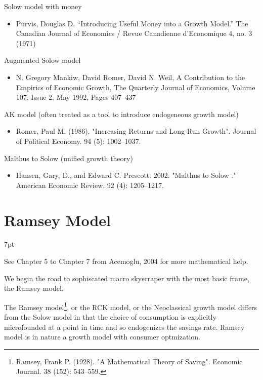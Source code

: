 \documentclass{article}
\newenvironment{greenblock}{%
\def\FrameCommand{%
  \hspace{1pt}%
    {\color{Green}%
    \vrule width 2pt}%
    {\color{greenshade}%
    \vrule width 4pt}%
  \colorbox{greenshade}%
}%
\MakeFramed{%
  \advance%
  \hsize-%
  \width%
  \FrameRestore}%
\noindent\hspace{-4.55pt}%
\begin{adjustwidth}{}{7pt}%
\vspace{2pt}\vspace{2pt}%
}
{%
\vspace{2pt}\end{adjustwidth}\endMakeFramed%
}
\begin{document}
Solow model with money
\begin{itemize}
  \item Purvis, Douglas D. “Introducing Useful Money into a Growth Model.” The Canadian Journal of Economics / Revue Canadienne d’Economique 4, no. 3 (1971)
\end{itemize}

Augmented Solow model

\begin{itemize}
  \item N. Gregory Mankiw, David Romer, David N. Weil, A Contribution to the Empirics of Economic Growth, The Quarterly Journal of Economics, Volume 107, Issue 2, May 1992, Pages 407–437
\end{itemize}

AK model (often treated as a tool to introduce endogeneous growth model)

\begin{itemize}
  \item Romer, Paul M. (1986). "Increasing Returns and Long-Run Growth". Journal of Political Economy. 94 (5): 1002–1037.
\end{itemize}

Malthus to Solow (unified growth theory)

\begin{itemize}
  \item Hansen, Gary, D., and Edward C. Prescott. 2002. "Malthus to Solow ." American Economic Review, 92 (4): 1205–1217.
\end{itemize}










\newpage
\section{Ramsey Model}

\begin{greenblock}
See Chapter 5 to Chapter 7 from Acemoglu, 2004 for more mathematical help.
\end{greenblock}

We begin the road to sophiscated macro skyscraper with the most basic frame, the Ramsey model. 

The Ramsey model\footnote{Ramsey, Frank P. (1928). "A Mathematical Theory of Saving". Economic Journal. 38 (152): 543–559.}, or the RCK model, or the Neoclassical growth model differs from the Solow model in that the choice of consumption is explicitly microfounded at a point in time and so endogenizes the savings rate. Ramsey model is in nature a growth model with consumer optmization.
\end{document}
